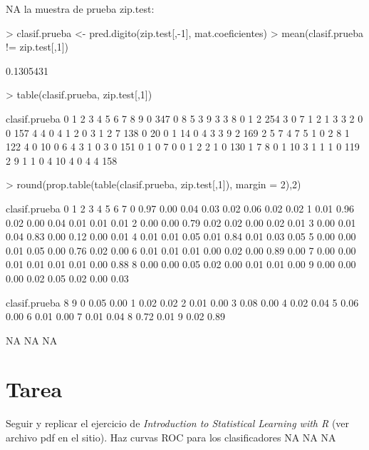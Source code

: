 \documentclass[nohyper]{tufte-handout}
\begin{document}
NA
la muestra de prueba zip.test:

\begin{Schunk}
\begin{Sinput}
> clasif.prueba <- pred.digito(zip.test[,-1], mat.coeficientes)
> mean(clasif.prueba != zip.test[,1])
\end{Sinput}
\begin{Soutput}
[1] 0.1305431
\end{Soutput}
\begin{Sinput}
> table(clasif.prueba, zip.test[,1])
\end{Sinput}
\begin{Soutput}
clasif.prueba   0   1   2   3   4   5   6   7   8   9
            0 347   0   8   5   3   9   3   3   8   0
            1   2 254   3   0   7   1   2   1   3   3
            2   0   0 157   4   4   0   4   1   2   0
            3   1   2   7 138   0  20   0   1  14   0
            4   3   3   9   2 169   2   5   7   4   7
            5   1   0   2   8   1 122   4   0  10   0
            6   4   3   1   0   3   0 151   0   1   0
            7   0   0   1   2   2   1   0 130   1   7
            8   0   1  10   3   1   1   1   0 119   2
            9   1   1   0   4  10   4   0   4   4 158
\end{Soutput}
\begin{Sinput}
> round(prop.table(table(clasif.prueba, zip.test[,1]), margin = 2),2)
\end{Sinput}
\begin{Soutput}
clasif.prueba    0    1    2    3    4    5    6    7
            0 0.97 0.00 0.04 0.03 0.02 0.06 0.02 0.02
            1 0.01 0.96 0.02 0.00 0.04 0.01 0.01 0.01
            2 0.00 0.00 0.79 0.02 0.02 0.00 0.02 0.01
            3 0.00 0.01 0.04 0.83 0.00 0.12 0.00 0.01
            4 0.01 0.01 0.05 0.01 0.84 0.01 0.03 0.05
            5 0.00 0.00 0.01 0.05 0.00 0.76 0.02 0.00
            6 0.01 0.01 0.01 0.00 0.02 0.00 0.89 0.00
            7 0.00 0.00 0.01 0.01 0.01 0.01 0.00 0.88
            8 0.00 0.00 0.05 0.02 0.00 0.01 0.01 0.00
            9 0.00 0.00 0.00 0.02 0.05 0.02 0.00 0.03
             
clasif.prueba    8    9
            0 0.05 0.00
            1 0.02 0.02
            2 0.01 0.00
            3 0.08 0.00
            4 0.02 0.04
            5 0.06 0.00
            6 0.01 0.00
            7 0.01 0.04
            8 0.72 0.01
            9 0.02 0.89
\end{Soutput}
\end{Schunk}

NA
NA
NA


\section{Tarea}
Seguir y replicar el ejercicio de {\em Introduction to Statistical Learning with R} (ver archivo pdf en el sitio).  Haz curvas ROC para los clasificadores
NA
NA
NA
\end{document}
